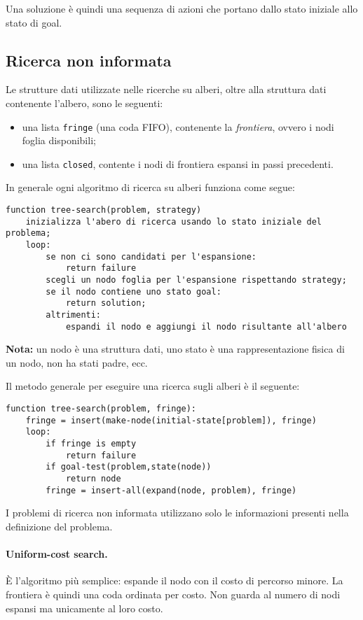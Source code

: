 \documentclass[a4paper, 11pt]{article}
\begin{document}
Una soluzione è quindi una sequenza di azioni che portano dallo stato iniziale allo stato di goal.




\subsection{Ricerca non informata}
Le strutture dati utilizzate nelle ricerche su alberi, oltre alla struttura dati contenente l'albero, sono le seguenti:
\begin{itemize}
	\item una lista \lstinline|fringe| (una coda FIFO), contenente la \textit{frontiera}, ovvero i nodi foglia disponibili;
	\item una lista \lstinline|closed|, contente i nodi di frontiera espansi in passi precedenti.
\end{itemize}
In generale ogni algoritmo di ricerca su alberi funziona come segue:
\begin{lstlisting}
function tree-search(problem, strategy)
	inizializza l'abero di ricerca usando lo stato iniziale del problema;
	loop:
		se non ci sono candidati per l'espansione:
			return failure
		scegli un nodo foglia per l'espansione rispettando strategy;
		se il nodo contiene uno stato goal:
			return solution;
		altrimenti:
			espandi il nodo e aggiungi il nodo risultante all'albero
\end{lstlisting}

\noindent
\textbf{Nota:} un nodo è una struttura dati, uno stato è una rappresentazione fisica di un nodo, non ha stati padre, ecc.

Il metodo generale per eseguire una ricerca sugli alberi è il seguente:
\begin{lstlisting}
function tree-search(problem, fringe):
	fringe = insert(make-node(initial-state[problem]), fringe) 
	loop:
		if fringe is empty
			return failure
		if goal-test(problem,state(node))
			return node
		fringe = insert-all(expand(node, problem), fringe)
\end{lstlisting}

I problemi di ricerca non informata utilizzano solo le informazioni presenti nella definizione del problema. 
\paragraph{Uniform-cost search.} È l'algoritmo più semplice: espande il nodo con il costo di percorso minore. La frontiera è quindi una coda ordinata per costo. Non guarda al numero di nodi espansi ma unicamente al loro costo.
\end{document}
